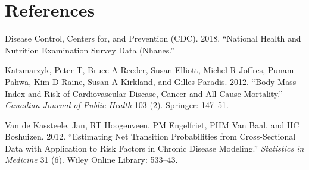 \documentclass[]{article}
\begin{document}
\section*{References}\label{references}

\hypertarget{refs}{}
\hypertarget{ref-NHANES}{}
Disease Control, Centers for, and Prevention (CDC). 2018. ``National
Health and Nutrition Examination Survey Data (Nhanes.''

\hypertarget{ref-katbody}{}
Katzmarzyk, Peter T, Bruce A Reeder, Susan Elliott, Michel R Joffres,
Punam Pahwa, Kim D Raine, Susan A Kirkland, and Gilles Paradis. 2012.
``Body Mass Index and Risk of Cardiovascular Disease, Cancer and
All-Cause Mortality.'' \emph{Canadian Journal of Public Health} 103 (2).
Springer: 147--51.

\hypertarget{ref-van2012estimating}{}
Van de Kassteele, Jan, RT Hoogenveen, PM Engelfriet, PHM Van Baal, and
HC Boshuizen. 2012. ``Estimating Net Transition Probabilities from
Cross-Sectional Data with Application to Risk Factors in Chronic Disease
Modeling.'' \emph{Statistics in Medicine} 31 (6). Wiley Online Library:
533--43.
\end{document}
